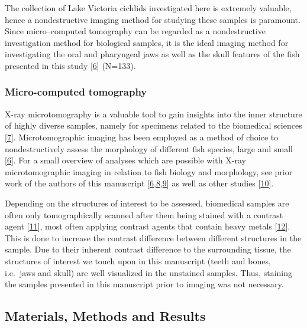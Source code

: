 The collection of Lake Victoria cichlids investigated here is extremely valuable, hence a nondestructive imaging method for studying these samples is paramount.
Since micro--computed tomography can be regarded as a nondestructive investigation method for biological samples, it is the ideal imaging method for investigating the oral and pharyngeal jaws as well as the skull features of the fish presented in this study {[}\protect\hyperlink{ref-19h9vxsYG}{6}{]} (N=133).

\hypertarget{micro-computed-tomography}{%
\subsubsection{Micro-computed tomography}\label{micro-computed-tomography}}

X-ray microtomography is a valuable tool to gain insights into the inner structure of highly diverse samples, namely for specimens related to the biomedical sciences {[}\protect\hyperlink{ref-IKVBgaCE}{7}{]}.
Microtomographic imaging has been employed as a method of choice to nondestructively assess the morphology of different fish species, large and small {[}\protect\hyperlink{ref-19h9vxsYG}{6}{]}.
For a small overview of analyses which are possible with X-ray microtomographic imaging in relation to fish biology and morphology, see prior work of the authors of this manuscript {[}\protect\hyperlink{ref-19h9vxsYG}{6},\protect\hyperlink{ref-8Pmc2mI8}{8},\protect\hyperlink{ref-BDrCSu8p}{9}{]} as well as other studies {[}\protect\hyperlink{ref-3rxGCEvJ}{10}{]}.

Depending on the structures of interest to be assessed, biomedical samples are often only tomographically scanned after them being stained with a contrast agent {[}\protect\hyperlink{ref-pN1S9E5p}{11}{]}, most often applying contrast agents that contain heavy metals {[}\protect\hyperlink{ref-kkBa4qNV}{12}{]}.
This is done to increase the contrast difference between different structures in the sample.
Due to their inherent contrast difference to the surrounding tissue, the structures of interest we touch upon in this manuscript (teeth and bones, i.e.~jaws and skull) are well visualized in the unstained samples.
Thus, staining the samples presented in this manuscript prior to imaging was not necessary.

\hypertarget{materials-methods-and-results}{%
\subsection{Materials, Methods and Results}\label{materials-methods-and-results}}

